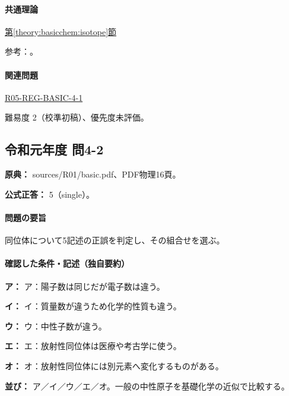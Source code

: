 \paragraph{共通理論} \hyperref[theory:basicchem:isotope]{第\ref*{theory:basicchem:isotope}節}

\par 参考：\cite{iupac_isotopes}。

\paragraph{関連問題} \hyperref[q:r05-reg-basic-4-1]{R05-REG-BASIC-4-1}

\par 難易度 2（校準初稿）、優先度未評価。

\subsection{令和元年度 問4-2}
\label{q:r01-reg-basic-4-2}

\noindent\textbf{原典：} sources/R01/basic.pdf、PDF物理16頁。

\textbf{公式正答：} 5（single）。

\paragraph{問題の要旨} 同位体について5記述の正誤を判定し、その組合せを選ぶ。

\paragraph{確認した条件・記述（独自要約）}\mbox{}\par

\noindent\textbf{ア：} ア：陽子数は同じだが電子数は違う。\par

\noindent\textbf{イ：} イ：質量数が違うため化学的性質も違う。\par

\noindent\textbf{ウ：} ウ：中性子数が違う。\par

\noindent\textbf{エ：} エ：放射性同位体は医療や考古学に使う。\par

\noindent\textbf{オ：} オ：放射性同位体には別元素へ変化するものがある。\par

\noindent\textbf{並び：} ア／イ／ウ／エ／オ。一般の中性原子を基礎化学の近似で比較する。\par

